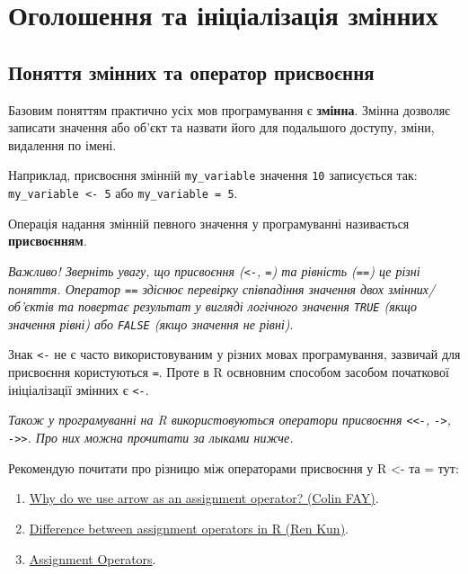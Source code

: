 \documentclass[
]{book}
\providecommand{\tightlist}{%
  \setlength{\itemsep}{0pt}\setlength{\parskip}{0pt}}
\begin{document}
\hypertarget{chapter21}{%
\section{Оголошення та ініціалізація змінних}\label{chapter21}}

\hypertarget{chapter211}{%
\subsection{Поняття змінних та оператор присвоєння}\label{chapter211}}

Базовим поняттям практично усіх мов програмування є \textbf{змінна}. Змінна дозволяє записати значення або об'єкт та назвати його для подальшого доступу, зміни, видалення по імені.

Наприклад, присвоєння змінній \texttt{my\_variable} значення \texttt{10} записується так: \texttt{my\_variable\ \textless{}-\ 5} або \texttt{my\_variable\ =\ 5}.

Операція надання змінній певного значення у програмуванні називається \textbf{присвоєнням}.

\emph{Важливо! Зверніть увагу, що присвоєння (\texttt{\textless{}-}, \texttt{=}) та рівність (\texttt{==}) це різні поняття. Оператор \texttt{==} здіснює перевірку співпадіння значення двох змінних/об'єктів та повертає результат у вигляді логічного значення \texttt{TRUE} (якщо значення рівні) або \texttt{FALSE} (якщо значення не рівні)}.

Знак \texttt{\textless{}-} не є часто використовуваним у різних мовах програмування, зазвичай для присвоєння користуються \texttt{=}. Проте в R освновним способом засобом початкової ініціалізації змінних є \texttt{\textless{}-}.

\emph{Також у програмуванні на R використовуються оператори присвоєння \texttt{\textless{}\textless{}-}, \texttt{-\textgreater{}}, \texttt{-\textgreater{}\textgreater{}}. Про них можна прочитати за лыками нижче.}

Рекомендую почитати про різницю між операторами присвоєння у R \textless- та = тут:

\begin{enumerate}
\def\labelenumi{\arabic{enumi}.}
\tightlist
\item
  \href{https://colinfay.me/r-assignment/}{Why do we use arrow as an assignment operator? (Colin FAY)}.
\item
  \href{https://renkun.me/2014/01/28/difference-between-assignment-operators-in-r/}{Difference between assignment operators in R (Ren Kun)}.
\item
  \href{https://stat.ethz.ch/R-manual/R-devel/library/base/html/assignOps.html}{Assignment Operators}.
\end{enumerate}
\end{document}
